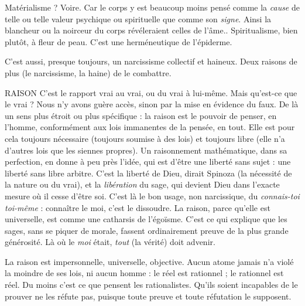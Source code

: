 Matérialisme ? Voire. Car le corps y est beaucoup moins pensé comme la
{\it cause} de telle ou telle valeur psychique ou spirituelle que comme son {\it signe}.
Ainsi la blancheur ou la noirceur du corps révéleraient celles de l’âme.. Spiritualisme,
bien plutôt, à fleur de peau. C’est une herméneutique de l’épiderme.

C’est aussi, presque toujours, un narcissisme collectif et haineux. Deux raisons
de plus (le narcissisme, la haine) de le combattre.

RAISON C'est le rapport vrai au vrai, ou du vrai à lui-même. Mais qu'est-ce
que le vrai ? Nous n’y avons guère accès, sinon par la mise en évidence
du faux. De là un sens plus étroit ou plus spécifique : la raison est le pouvoir
de penser, en l’homme, conformément aux lois immanentes de la pensée,
en tout. Elle est pour cela toujours nécessaire (toujours soumise à des lois) et
toujours libre (elle n’a d’autres lois que les siennes propres). Un raisonnement
mathématique, dans sa perfection, en donne à peu près l’idée, qui est d’être une
liberté sans sujet : une liberté sans libre arbitre. C’est la liberté de Dieu, dirait
Spinoza (la nécessité de la nature ou du vrai), et la {\it libération} du sage, qui
devient Dieu dans l’exacte mesure où il cesse d’être soi. C’est là le bon usage,
non narcissique, du {\it connais-toi toi-même} : connaître le moi, c’est le dissoudre.
La raison, parce qu’elle est universelle, est comme une catharsis de l’égoïsme.
C’est ce qui explique que les sages, sans se piquer de morale, fassent ordinairement
preuve de la plus grande générosité. Là où le {\it moi} était, {\it tout} (la vérité) doit
advenir.

La raison est impersonnelle, universelle, objective. Aucun atome jamais n’a
violé la moindre de ses lois, ni aucun homme : le réel est rationnel ; le rationnel
est réel. Du moins c’est ce que pensent les rationalistes. Qu'ils soient incapables
de le prouver ne les réfute pas, puisque toute preuve et toute réfutation le supposent.


